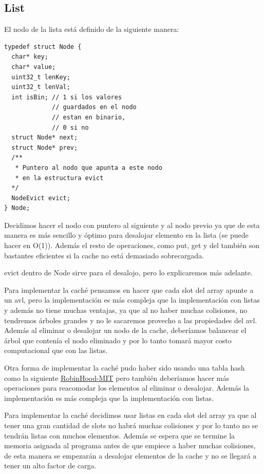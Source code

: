 \documentclass{article}
\begin{document}
\subsection{List}

El nodo de la lista está definido de la siguiente manera:

\begin{lstlisting}[style=CStyle]
typedef struct Node {
  char* key;
  char* value;
  uint32_t lenKey;
  uint32_t lenVal; 
  int isBin; // 1 si los valores
             // guardados en el nodo
             // estan en binario,
             // 0 si no
  struct Node* next;
  struct Node* prev;    
  /**
   * Puntero al nodo que apunta a este nodo
   * en la estructura evict  
  */
  NodeEvict evict;
} Node; 
\end{lstlisting}

Decidimos hacer el nodo con puntero al siguiente y al
nodo previo ya que de esta manera es más sencillo y
óptimo para desalojar elemento en la lista 
(se puede hacer en O(1)). Además el resto de operaciones,
como put, get y del también son bastantes eficientes si
la cache no está demasiado sobrecargada.

evict dentro de Node sirve para el desalojo, pero lo
explicaremos más adelante.

Para implementar la caché pensamos en hacer que cada slot
del array apunte a un avl, pero la implementación es más
compleja que la implementación con listas y además no
tiene muchas ventajas, ya que al no haber
muchas colisiones, no tendremos árboles grandes y no le 
sacaremos provecho a las propiedades del avl. Además al
eliminar o desalojar un nodo de la cache, deberíamos
balancear el árbol que contenía el nodo eliminado y por
lo tanto tomará mayor costo computacional que con las
listas.

Otra forma de implementar la caché pudo haber sido usando
una tabla hash como la siguiente 
\href{https://dspace.mit.edu/handle/1721.1/130693}{RobinHood-MIT}
pero también deberíamos hacer más operaciones para reacomodar los
elementos al eliminar o desalojar. Además la implementación
es más compleja que la implementación con listas.

Para implementar la caché decidimos usar listas en cada
slot del array ya que al tener una gran cantidad de
slots no habrá muchas colisiones y por lo tanto no
se tendrán listas con muchos elementos. Además se
espera que se termine la memoria asignada al programa
antes de que empiece a haber muchas
colisiones, de esta manera se empezarán a desalojar
elementos de la cache y no se llegará a tener un alto
factor de carga.
\end{document}
